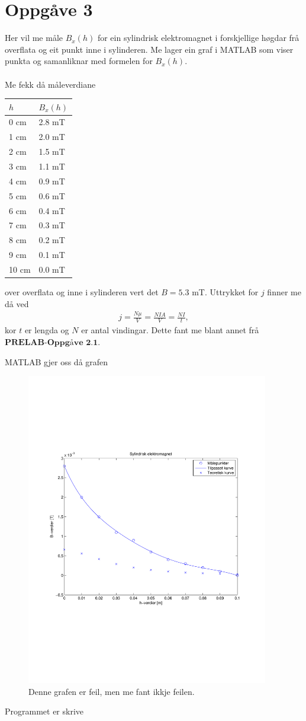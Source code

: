 \documentclass[11pt, a4paper]{article}
\begin{document}
\newpage

\section*{Oppgåve 3}
  Her vil me måle $B_{x}(h)$ for ein sylindrisk elektromagnet i forskjellige høgdar frå overflata og eit punkt inne i sylinderen. Me lager ein graf i MATLAB som viser punkta og
  samanliknar med formelen for $B_{x}(h)$. \\ \\
  Me fekk då måleverdiane
  \begin{center}
    \begin{tabular}{|l|l|}
      \hline
      $h$ & $B_{x}(h)$ \\
      \hline
      0 cm & 2.8 mT \\
      1 cm & 2.0 mT \\
      2 cm & 1.5 mT \\
      3 cm & 1.1 mT \\
      4 cm & 0.9 mT \\
      5 cm & 0.6 mT \\
      6 cm & 0.4 mT \\
      7 cm & 0.3 mT \\
      8 cm & 0.2 mT \\
      9 cm & 0.1 mT \\
      10 cm & 0.0 mT \\
      \hline
    \end{tabular}
  \end{center}
  over overflata og inne i sylinderen vert det $B = 5.3$ mT. Uttrykket for $j$ finner me då ved
  \begin{align*}
    j = \frac{N\mu}{V} = \frac{NIA}{V} = \frac{NI}{t},
  \end{align*}
  kor $t$ er lengda og $N$ er antal vindingar.
  Dette fant me blant annet frå $\textbf{PRELAB-Oppgåve 2.1}$.

  MATLAB gjer oss då grafen
  \begin{figure}[H]
    \centering
    \includegraphics[width=400px]{Oppgave3.pdf}
    \caption{Denne grafen er feil, men me fant ikkje feilen.}
  \end{figure}

  Programmet er skrive
  
\end{document}
